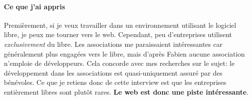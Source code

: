 \documentclass[a4paper,12pt, draft]{report}
\begin{document}
\paragraph{Ce que j'ai appris}
Premièrement, si je veux travailler dans un environnement utilisant le logiciel libre, je peux me tourner vers le web. Cependant, peu d'entreprises utilisent \textit{exclusivement} du libre. Les associations me paraissaient intéressantes car généralement plus engagées vers le libre, mais d'après Fabien aucune association n'emploie de développeurs. Cela concorde avec mes recherches sur le sujet: le développement dans les associations est quasi-uniquement assuré par des bénévoles.
Ce que je retiens donc de cette interview est que les entreprises entièrement libres sont plutôt rares. \textbf{Le web est donc une piste intéressante}.
\end{document}
